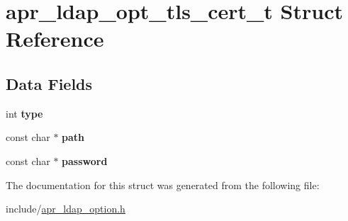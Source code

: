 \hypertarget{structapr__ldap__opt__tls__cert__t}{\section{apr\-\_\-ldap\-\_\-opt\-\_\-tls\-\_\-cert\-\_\-t Struct Reference}
\label{structapr__ldap__opt__tls__cert__t}
}
\subsection*{Data Fields}
\begin{DoxyCompactItemize}
\item 
\hypertarget{structapr__ldap__opt__tls__cert__t_af311a05d46a4a7a2abb7c3c00711a9a5}{int {\bfseries type}}\label{structapr__ldap__opt__tls__cert__t_af311a05d46a4a7a2abb7c3c00711a9a5}

\item 
\hypertarget{structapr__ldap__opt__tls__cert__t_aed3c99bd7050472f8009eae10a34ce53}{const char $\ast$ {\bfseries path}}\label{structapr__ldap__opt__tls__cert__t_aed3c99bd7050472f8009eae10a34ce53}

\item 
\hypertarget{structapr__ldap__opt__tls__cert__t_a8771a4082cb7ed439e1fffb984d9f5c0}{const char $\ast$ {\bfseries password}}\label{structapr__ldap__opt__tls__cert__t_a8771a4082cb7ed439e1fffb984d9f5c0}

\end{DoxyCompactItemize}


The documentation for this struct was generated from the following file\-:\begin{DoxyCompactItemize}
\item 
include/\hyperlink{apr__ldap__option_8h}{apr\-\_\-ldap\-\_\-option.\-h}\end{DoxyCompactItemize}
